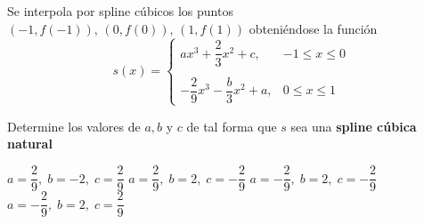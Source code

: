 \begin{pregunta}
\begin{cuerpo}
Se interpola por spline c\'ubicos los puntos $(-1,f(-1)),\,(0,f(0)),\,(1,f(1))$ obteni\'endose la funci\'on
\[{s(x)=\left\{ \begin{array}{cl} ax^3+\dfrac{2}{3}x^2+c, & -1\leq x \leq 0 \\ &\\
-\dfrac{2}{9}x^3-\dfrac{b}{3}x^2+a, & 0\leq x \leq 1  \end{array}\right.}\]

Determine los valores de ${a,b}$ y ${c}$ de tal forma que ${s}$ sea una {\bf spline c\'ubica natural}
\end{cuerpo}
\begin{multicols}{2}
\begin{alternativas}
{${a=\dfrac{2}{9}, \;  b=-2, \; c=\dfrac{2}{9}}$}
{${a=\dfrac{2}{9}, \;  b=2, \; c=-\dfrac{2}{9}}$}
{${a=-\dfrac{2}{9}, \;  b=2, \; c=-\dfrac{2}{9}}$}
{${a=-\dfrac{2}{9}, \;  b=2, \; c=\dfrac{2}{9}}$}
\end{alternativas}
\end{multicols}
\justificacion{7cm}
\end{pregunta}